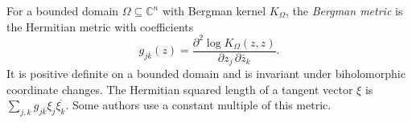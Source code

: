 
For a bounded domain $\Omega\subseteq\mathbb C^n$ with Bergman kernel $K_\Omega$, the \emph{Bergman metric} is the Hermitian metric with coefficients
\[
g_{j\bar k}(z)=\frac{\partial^2\log K_\Omega(z,z)}{\partial z_j\,\partial\bar z_k}.
\]
It is positive definite on a bounded domain and is invariant under biholomorphic coordinate changes. The Hermitian squared length of a tangent vector $\xi$ is $\sum_{j,k}g_{j\bar k}\xi_j\overline{\xi_k}$. Some authors use a constant multiple of this metric.
